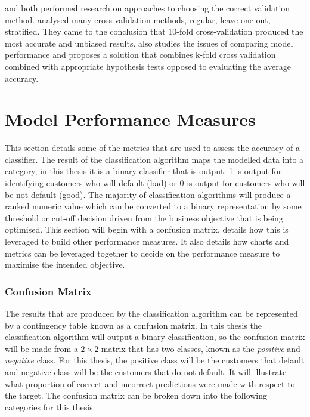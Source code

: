 \cite{kohavi_study_1995} and \cite{salzberg_comparing_1997} both performed research on approaches to choosing the correct validation method. \cite{kohavi_study_1995} analysed many cross validation methods, regular, leave-one-out, stratified. They came to the conclusion that 10-fold cross-validation produced the most accurate and unbiased results. \cite{salzberg_comparing_1997} also studies the issues of comparing model performance and proposes a solution that combines k-fold cross validation combined with appropriate hypothesis tests opposed to evaluating the average accuracy.   

\section{Model Performance Measures}\label{modelPerformMeasure}

This section details some of the metrics that are used to assess the accuracy of a classifier. The result of the classification algorithm maps the modelled data into a category, in this thesis it is a binary classifier that is output: 1 is output for identifying customers who will default (bad) or 0 is output for customers who will be not-default (good). The majority of classification algorithms will produce a ranked numeric value which can be converted to a binary representation by some threshold or cut-off decision driven from  the business objective that is being optimised. This section will begin with a confusion matrix, details how this is leveraged to build other performance measures. It also details how charts and metrics can be leveraged together to decide on the performance measure to maximise the intended objective.

\subsubsection{Confusion Matrix}

The results that are produced by the classification algorithm can be represented by a contingency table known as a confusion matrix. In this thesis the classification algorithm will output a binary classification, so the confusion matrix will be made from a $2 \times 2$ matrix that has two classes, known as the \textit{positive} and \textit{negative} class. For this thesis, the positive class will be the customers that default and negative class will be the customers that do not default. It will illustrate what proportion of correct and incorrect predictions were made with respect to the target. The confusion matrix can be broken down into the following categories for this thesis:

